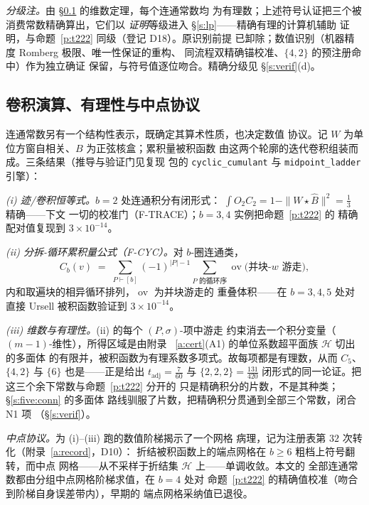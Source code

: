 \documentclass[11pt]{article}
\numberwithin{equation}{section}
\theoremstyle{definition}
\theoremstyle{remark}
\begin{document}
\emph{分级注。}由 \S\ref{s:conv} 的维数定理，每个连通常数均
为有理数；上述符号认证把三个被消费常数精确算出，它们以
\emph{证明}等级进入 \S\ref{s:lp}——精确有理的计算机辅助
证明，与命题~\ref{p:t222} 同级（登记 D18）。原识别前提
已卸除；数值识别（机器精度 Romberg 极限、唯一性保证的重构、
同流程双精确锚校准、$\{4,2\}$ 的预注册命中）作为独立确证
保留，与符号值逐位吻合。精确分级见 \S\ref{s:verif}(d)。

\subsection{卷积演算、有理性与中点协议}\label{s:conv}

连通常数另有一个结构性表示，既确定其算术性质，也决定数值
协议。记 $W$ 为单位方窗自相关、$B$ 为正弦核盒；累积量被积函数
由这两个轮廓的迭代卷积组装而成。三条结果（推导与验证门见复现
包的 \texttt{cyclic\_cumulant} 与 \texttt{midpoint\_ladder}
引擎）：

\emph{(i) 迹/卷积恒等式。}$b=2$ 处连通积分有闭形式：
$\int O_2C_2=1-\|W\star\widehat B\|^{2}=\tfrac13$ 精确——下文
一切的校准门（F-TRACE）；$b=3,4$ 实例把命题~\ref{p:t222} 的
精确配对值复现到 $3\times10^{-14}$。

\emph{(ii) 分拆-循环累积量公式（F-CYC）。}对 $b$-圈连通类，
\[
C_b(v)\;=\;\sum_{P\vdash[b]}(-1)^{|P|-1}
\sum_{\text{$P$ 的循环序}}
\operatorname{ov}\bigl(\text{并块-}w\text{ 游走}\bigr),
\]
内和取遍块的相异循环排列，$\operatorname{ov}$ 为并块游走的
重叠体积——在 $b=3,4,5$ 处对直接 Ursell 被积函数验证到
$3\times10^{-14}$。

\emph{(iii) 维数与有理性。}(ii) 的每个 $(P,\sigma)$-项中游走
约束消去一个积分变量（$(m-1)$-维性），所得区域是由附录
~\ref{a:cert}(A1) 的单位系数超平面族 $\mathcal H$ 切出的多面体
的有限并，被积函数为有理系数多项式。故每项都是有理数，从而
$C_5$、$\{4,2\}$ 与 $\{6\}$ 也是——正是给出
$t_{\mathrm{adj}}=\tfrac7{60}$ 与 $\{2,2,2\}=\tfrac{131}{420}$
闭形式的同一论证。把这三个余下常数与命题~\ref{p:t222} 分开的
只是精确积分的片数，不是其种类；\S\ref{s:five:conn} 的多面体
路线驯服了片数，把精确积分贯通到全部三个常数，闭合 N1 项
（\S\ref{s:verif}）。

\emph{中点协议。}为 (i)--(iii) 跑的数值阶梯揭示了一个网格
病理，记为注册表第 $32$ 次转化（附录~\ref{a:record}，D10）：
折结被积函数上的端点网格在 $b\ge6$ 粗档上符号翻转，而中点
网格——从不采样于折结集 $\mathcal H$ 上——单调收敛。本文的
全部连通常数都由分组中点网格阶梯求值，在 $b=4$ 处对
命题~\ref{p:t222} 的精确值校准（吻合到阶梯自身误差带内），早期的
端点网格采纳值已退役。
\end{document}
